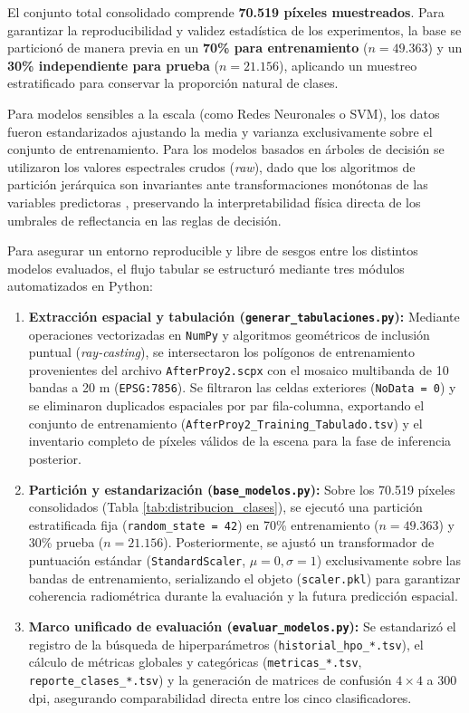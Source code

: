\documentclass[12pt]{article}
\begin{document}
El conjunto total consolidado comprende \textbf{70.519 píxeles muestreados}. Para garantizar la reproducibilidad y validez estadística de los experimentos, la base se particionó de manera previa en un \textbf{70\% para entrenamiento} ($n = 49.363$) y un \textbf{30\% independiente para prueba} ($n = 21.156$), aplicando un muestreo estratificado para conservar la proporción natural de clases. 

Para modelos sensibles a la escala (como Redes Neuronales o SVM), los datos fueron estandarizados ajustando la media y varianza exclusivamente sobre el conjunto de entrenamiento. Para los modelos basados en árboles de decisión se utilizaron los valores espectrales crudos (\textit{raw}), dado que los algoritmos de partición jerárquica son invariantes ante transformaciones monótonas de las variables predictoras \cite{breiman1984classification}, preservando la interpretabilidad física directa de los umbrales de reflectancia en las reglas de decisión.

Para asegurar un entorno reproducible y libre de sesgos entre los distintos modelos evaluados, el flujo tabular se estructuró mediante tres módulos automatizados en Python:
\begin{enumerate}
    \item \textbf{Extracción espacial y tabulación (\texttt{generar\_tabulaciones.py}):} Mediante operaciones vectorizadas en \texttt{NumPy} y algoritmos geométricos de inclusión puntual (\textit{ray-casting}), se intersectaron los polígonos de entrenamiento provenientes del archivo \texttt{AfterProy2.scpx} con el mosaico multibanda de 10 bandas a 20 m (\texttt{EPSG:7856}). Se filtraron las celdas exteriores (\texttt{NoData = 0}) y se eliminaron duplicados espaciales por par fila-columna, exportando el conjunto de entrenamiento (\texttt{AfterProy2\_Training\_Tabulado.tsv}) y el inventario completo de píxeles válidos de la escena para la fase de inferencia posterior.
    \item \textbf{Partición y estandarización (\texttt{base\_modelos.py}):} Sobre los 70.519 píxeles consolidados (Tabla \ref{tab:distribucion_clases}), se ejecutó una partición estratificada fija (\texttt{random\_state = 42}) en 70\% entrenamiento ($n = 49.363$) y 30\% prueba ($n = 21.156$). Posteriormente, se ajustó un transformador de puntuación estándar (\texttt{StandardScaler}, $\mu = 0, \sigma = 1$) exclusivamente sobre las bandas de entrenamiento, serializando el objeto (\texttt{scaler.pkl}) para garantizar coherencia radiométrica durante la evaluación y la futura predicción espacial.
    \item \textbf{Marco unificado de evaluación (\texttt{evaluar\_modelos.py}):} Se estandarizó el registro de la búsqueda de hiperparámetros (\texttt{historial\_hpo\_*.tsv}), el cálculo de métricas globales y categóricas (\texttt{metricas\_*.tsv}, \texttt{reporte\_clases\_*.tsv}) y la generación de matrices de confusión $4 \times 4$ a 300 dpi, asegurando comparabilidad directa entre los cinco clasificadores.
\end{enumerate}
\end{document}
